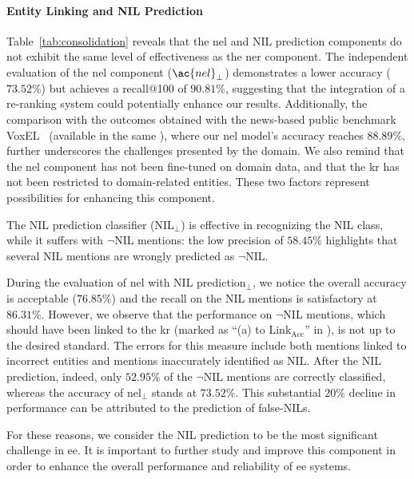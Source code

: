 

\paragraph{Entity Linking and NIL Prediction}

Table~\ref{tab:consolidation} reveals that the \ac{nel} and NIL prediction components do not exhibit the same level of effectiveness as the \ac{ner} component. The independent evaluation of the \ac{nel} component ($\ac{nel}_\perp$) demonstrates a lower accuracy ($73.52\%$) but achieves a recall@100 of $90.81\%$, suggesting that the integration of a re-ranking system could potentially enhance our results. Additionally, the comparison with the outcomes obtained with the news-based public benchmark VoxEL~\cite{rosales2018voxel} (available in the same ), where our \ac{nel} model's accuracy reaches $88.89\%$, further underscores the challenges presented by the domain. We also remind that the \ac{nel} component has not been fine-tuned on domain data, and that the \acl{kr} has not been restricted to domain-related entities. These two factors represent possibilities for enhancing this component.

The NIL prediction classifier (NIL$_\perp$) is effective in recognizing the NIL class, while it suffers with $\neg$NIL mentions: the low precision of $58.45\%$ highlights that several NIL mentions are wrongly predicted as $\neg$NIL.


During the evaluation of \ac{nel} with NIL prediction$_\perp$, we notice the overall accuracy is acceptable ($76.85\%$) and the recall on the NIL mentions is satisfactory at $86.31\%$. However, we observe that the performance on $\neg$NIL mentions, which should have been linked to the \ac{kr} (marked as ``(a) to Link$_\mathrm{Acc}$'' in ), is not up to the desired standard. The errors for this measure include both mentions linked to incorrect entities and mentions inaccurately identified as NIL. After the NIL prediction, indeed, only $52.95\%$ of the $\neg$NIL mentions are correctly classified, whereas the accuracy of \ac{nel}$_\perp$ stands at $73.52\%$. This substantial $20\%$ decline in performance can be attributed to the prediction of false-NILs.

For these reasons, we consider the NIL prediction to be the most significant challenge in \ac{ee}. It is important to further study and improve this component in order to enhance the overall performance and reliability of \ac{ee} systems.



